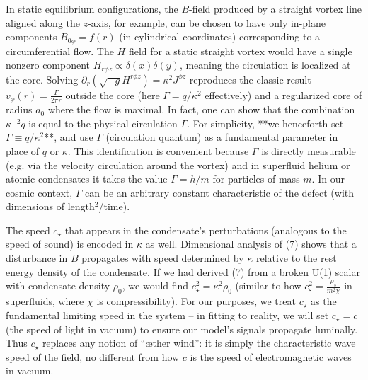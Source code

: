 \documentclass[12pt]{article}
\begin{document}
In static equilibrium configurations, the $B$-field produced by a straight vortex line aligned along the $z$-axis, for example, can be chosen to have only in-plane components $B_{0\phi}= f(r)$ (in cylindrical coordinates) corresponding to a circumferential flow. The $H$ field for a static straight vortex would have a single nonzero component $H_{r\phi z} \propto \delta(x)\delta(y)$, meaning the circulation is localized at the core. Solving $\partial_r(\sqrt{-g} H^{r\phi z}) = \kappa^2 J^{\phi z}$ reproduces the classic result $v_\phi(r) = \frac{\Gamma}{2\pi r}$ outside the core (here $\Gamma = q/\kappa^2$ effectively) and a regularized core of radius $a_0$ where the flow is maximal. In fact, one can show that the combination $\kappa^{-2} q$ is equal to the physical circulation $\Gamma$. For simplicity, **we henceforth set $\Gamma \equiv q/\kappa^2$**, and use $\Gamma$ (circulation quantum) as a fundamental parameter in place of $q$ or $\kappa$. This identification is convenient because $\Gamma$ is directly measurable (e.g. via the velocity circulation around the vortex) and in superfluid helium or atomic condensates it takes the value $\Gamma = h/m$ for particles of mass $m$. In our cosmic context, $\Gamma$ can be an arbitrary constant characteristic of the defect (with dimensions of length${}^2$/time). 

The speed $c_\star$ that appears in the condensate’s perturbations (analogous to the speed of sound) is encoded in $\kappa$ as well. Dimensional analysis of (7) shows that a disturbance in $B$ propagates with speed determined by $\kappa$ relative to the rest energy density of the condensate. If we had derived (7) from a broken U(1) scalar with condensate density $\rho_0$, we would find $c_\star^2 = \kappa^2 \rho_0$ (similar to how $c_{\text{s}}^2 = \frac{\rho_s}{m^2\chi}$ in superfluids, where $\chi$ is compressibility). For our purposes, we treat $c_\star$ as the fundamental limiting speed in the system – in fitting to reality, we will set $c_\star = c$ (the speed of light in vacuum) to ensure our model’s signals propagate luminally. Thus $c_\star$ replaces any notion of “æther wind”: it is simply the characteristic wave speed of the field, no different from how $c$ is the speed of electromagnetic waves in vacuum.
\end{document}
